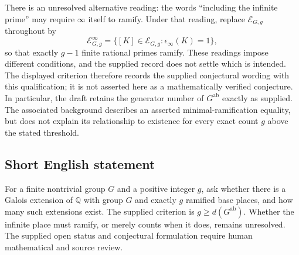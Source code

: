 \documentclass[11pt]{article}
\newcommand{\Q}{\mathbb{Q}}
\begin{document}
There is an unresolved alternative reading: the words ``including the infinite prime'' may require \(\infty\) itself to ramify. Under that reading, replace \(\mathcal E_{G,g}\) throughout by
\[
\mathcal E^{\infty}_{G,g}=\{[K]\in\mathcal E_{G,g}:\epsilon_\infty(K)=1\},
\]
so that exactly \(g-1\) finite rational primes ramify. These readings impose different conditions, and the supplied record does not settle which is intended. The displayed criterion therefore records the supplied conjectural wording with this qualification; it is not asserted here as a mathematically verified conjecture. In particular, the draft retains the generator number of \(G^{\mathrm{ab}}\) exactly as supplied. The associated background describes an asserted minimal-ramification equality, but does not explain its relationship to existence for every exact count \(g\) above the stated threshold.
\subsection{Short English statement}
For a finite nontrivial group \(G\) and a positive integer \(g\), ask whether there is a Galois extension of \(\Q\) with group \(G\) and exactly \(g\) ramified base places, and how many such extensions exist. The supplied criterion is \(g\ge d(G^{\mathrm{ab}})\). Whether the infinite place must ramify, or merely counts when it does, remains unresolved. The supplied open status and conjectural formulation require human mathematical and source review.
\end{document}
